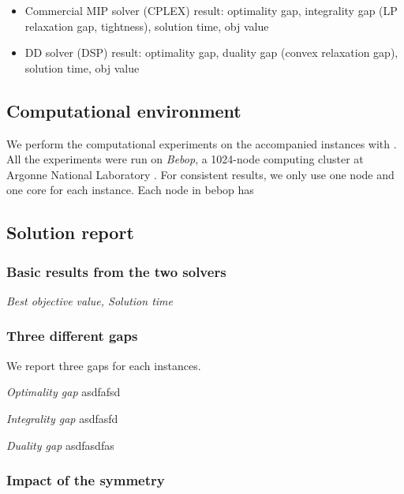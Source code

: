 %
%


\begin{itemize}
	\item Commercial MIP solver (CPLEX) result: optimality gap, integrality gap (LP relaxation gap, tightness), solution time, obj value
	\item DD solver (DSP) result: optimality gap, duality gap (convex relaxation gap), solution time, obj value
\end{itemize}

\subsection{Computational environment}
We perform the computational experiments on the accompanied instances with \siplibtwo. All the experiments were run on \textit{Bebop}, a 1024-node computing cluster at Argonne National Laboratory \cite{bebop}. For consistent results, we only use one node and one core for each instance. Each node in bebop has 

\subsection{Solution report}

\subsubsection {Basic results from the two solvers}
\noindent\textit{Best objective value, Solution time}

\subsubsection{Three different gaps}
We report three gaps for each instances.

\noindent\textit{Optimality gap} asdfafsd

\noindent\textit{Integrality gap} asdfasfd

\noindent\textit{Duality gap} asdfasdfas

\subsubsection{Impact of the symmetry}
%

